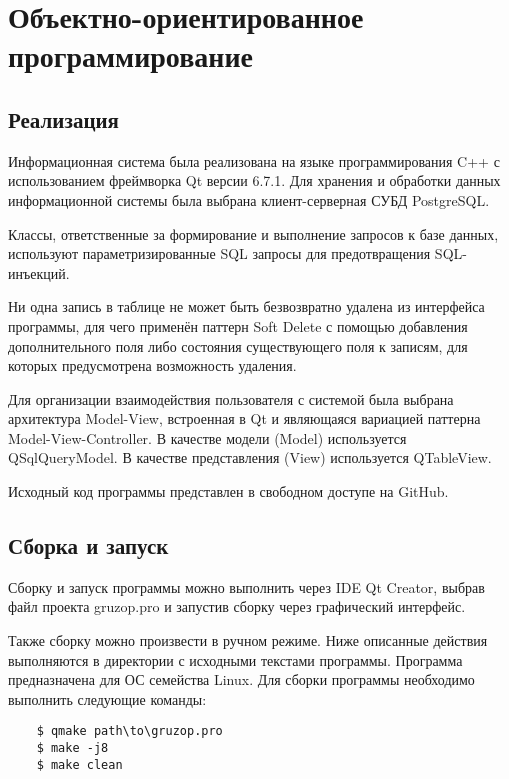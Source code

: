 \chapter{Объектно-ориентированное программирование}


\section{Реализация}
Информационная система была реализована на 
языке программирования C++ с использованием 
фреймворка Qt версии 6.7.1. 
Для хранения и обработки данных информационной системы 
была выбрана клиент-серверная СУБД PostgreSQL. 

Классы, ответственные за формирование и выполнение запросов к базе данных, 
используют параметризированные SQL запросы 
для предотвращения SQL-инъекций. 

Ни одна запись в таблице не может быть безвозвратно удалена 
из интерфейса программы, для чего применён паттерн Soft Delete
с помощью добавления дополнительного поля 
либо состояния существующего поля к записям,
для которых предусмотрена возможность удаления.

Для организации взаимодействия пользователя с системой была выбрана
архитектура Model-View, встроенная в Qt и являющаяся вариацией
паттерна Model-View-Controller. 
В качестве модели (Model) используется QSqlQueryModel. 
В качестве представления (View) используется QTableView.

Исходный код программы представлен в свободном доступе на GitHub. 


\section{Сборка и запуск}
Сборку и запуск программы можно выполнить через IDE Qt Creator, 
выбрав файл проекта gruzop.pro и запустив сборку через 
графический интерфейс. 

Также сборку можно произвести в ручном режиме. Ниже описанные действия 
выполняются в директории с исходными текстами программы.
Программа предназначена для ОС семейства Linux.
Для сборки программы необходимо выполнить следующие команды:

\lstset{
    language=bash, basicstyle=\ttfamily,
    aboveskip=0mm, belowskip=5mm, xleftmargin=5mm
}

\begin{lstlisting}
    $ qmake path\to\gruzop.pro
    $ make -j8
    $ make clean
\end{lstlisting}

